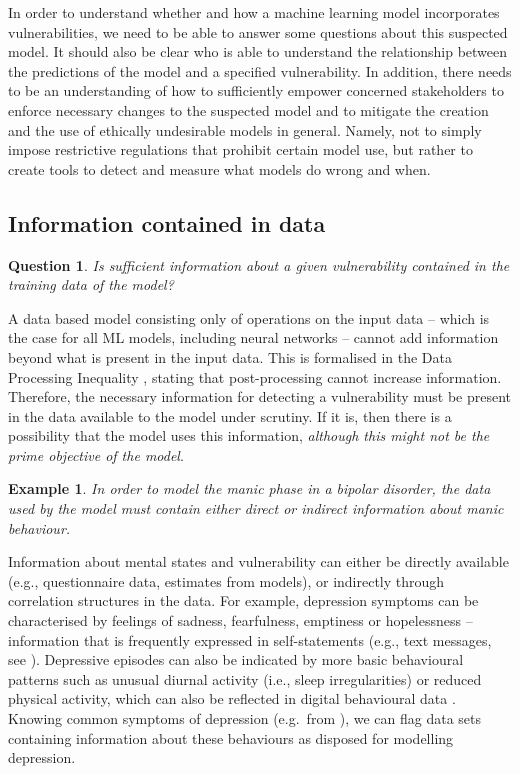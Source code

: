 \documentclass[11pt,theapa]{article}
\theoremstyle{plain}
\newtheorem{question}{Question}
\newtheorem{case}{Example}
\begin{document}
In order to understand whether and how a machine learning model incorporates vulnerabilities, we need to be able to answer some questions about this suspected model. It should also be clear who is able to understand the relationship between the predictions of the model and a specified vulnerability. In addition, there needs to be an understanding of how to sufficiently empower concerned stakeholders to enforce necessary changes to the suspected model and to mitigate the creation and the use of ethically undesirable models in general. Namely, not to simply impose restrictive regulations that prohibit certain model use, but rather to create tools to detect and measure what models do wrong and when. 
\subsection{Information contained in data}
\begin{question}
    Is sufficient information about a given vulnerability contained in the training data of the model?
\end{question}

A data based model consisting only of operations on the input data -- which is the case for all ML models, including neural networks -- cannot add information beyond what is present in the input data. This is formalised in the Data Processing Inequality \cite{Beaudry2012AnIP}, stating that post-processing cannot increase information. Therefore, the necessary information for detecting a vulnerability must be present in the data available to the model under scrutiny. If it is, then there is a possibility that the model uses this information, \emph{although this might not be the prime objective of the model}.

\begin{case}
    In order to model the manic phase in a bipolar disorder, the data used by the model must contain either direct or indirect information about manic behaviour. 
\end{case}

Information about mental states and vulnerability can either be directly available (e.g., questionnaire data, estimates from models), or indirectly through correlation structures in the data. For example, depression symptoms can be characterised by feelings of sadness, fearfulness, emptiness or hopelessness -- information that is frequently expressed in self-statements (e.g., text messages, see \cite{Liu2022}). Depressive episodes can also be indicated by more basic behavioural patterns such as unusual diurnal activity (i.e., sleep irregularities) or reduced physical activity, which can also be reflected in digital behavioural data \cite{Schoedel2020,Saeb2016}.
Knowing common symptoms of depression (e.g.\ from \cite{Dsm5}), we can flag data sets containing information about these behaviours as disposed for modelling depression. 
\end{document}

